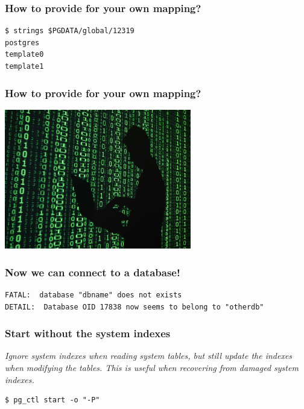 \documentclass{beamer}
\begin{document}
\begin{frame}[fragile]
  \frametitle{How to provide for your own mapping?}

  \begin{verbatim}
$ strings $PGDATA/global/12319
postgres
template0
template1
  \end{verbatim}  
\end{frame}

\begin{frame}
  \frametitle{How to provide for your own mapping?}
  
  \vfill
  
  \begin{center}
    \includegraphics[height=2.4in]{Hacker-2.jpg}
  \end{center}
\end{frame}

\begin{frame}[fragile]
  \frametitle{Now we can connect to a database!}
  
  \vfill

  \begin{verbatim}
FATAL:  database "dbname" does not exists
DETAIL:  Database OID 17838 now seems to belong to "otherdb"
  \end{verbatim}  
\end{frame}

\begin{frame}[fragile]
  \frametitle{Start without the system indexes}
  
  \textit{Ignore system indexes when reading system tables, but still update
    the indexes when modifying the tables. This is useful when recovering
    from damaged system indexes.}
  \vfill

  \begin{verbatim}
$ pg_ctl start -o "-P"
  \end{verbatim}  
\end{frame}
\end{document}
